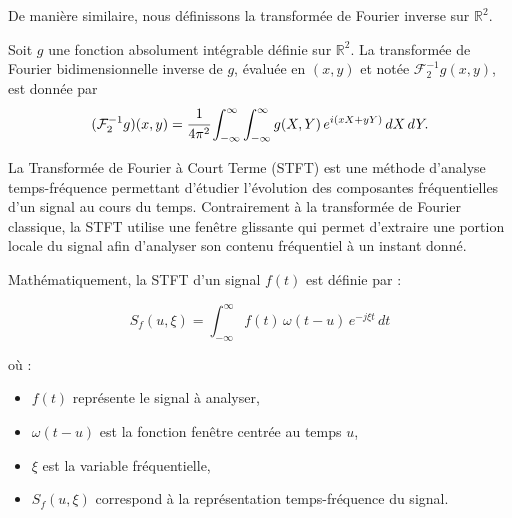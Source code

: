 De manière similaire, nous définissons la transformée de Fourier inverse sur $\mathbb{R}^2$.
\begin{definition}
Soit \( g \) une fonction absolument intégrable définie sur \( \mathbb{R}^2 \).
La transformée de Fourier bidimensionnelle inverse de \( g \), évaluée en \((x,y)\)
et notée \( \mathcal{F}_2^{-1} g(x,y) \), est donnée par
\begin{equation}
(\mathcal{F}_2^{-1} g)(x,y) = \cfrac{1}{4\pi^2}\int_{-\infty}^{\infty} \int_{-\infty}^{\infty} 
g(X,Y)\, e^{i (xX + yY)} \, dX\, dY.
\end{equation}
\end{definition}




\begin{definition}La Transformée de Fourier à Court Terme (STFT) est une méthode d'analyse temps-fréquence permettant d'étudier l'évolution des composantes fréquentielles d'un signal au cours du temps. Contrairement à la transformée de Fourier classique, la STFT utilise une fenêtre glissante qui permet d'extraire une portion locale du signal afin d'analyser son contenu fréquentiel à un instant donné.

Mathématiquement, la STFT d'un signal $f(t)$ est définie par :

\begin{equation}
S_f(u,\xi) = \int_{-\infty}^{\infty} f(t)\,\omega(t-u)\,e^{-j\xi t}\,dt
\label{eq:stft}
\end{equation}
\end{definition}
où :
\begin{itemize}
    \item $f(t)$ représente le signal à analyser,
    \item $\omega(t-u)$ est la fonction fenêtre centrée au temps $u$,
    \item $\xi$ est la variable fréquentielle,
    \item $S_f(u,\xi)$ correspond à la représentation temps-fréquence du signal.
\end{itemize}


